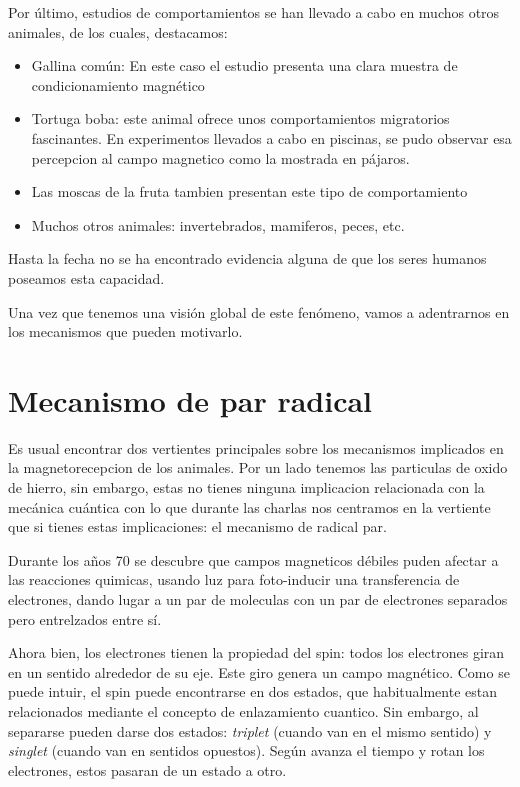 \documentclass[1p]{elsarticle}
\begin{document}
Por último, estudios de comportamientos se han llevado a cabo en muchos otros animales, de los cuales, destacamos: 
\begin{itemize}
	\item Gallina común: En este caso el estudio presenta una clara muestra de condicionamiento magnético
	\item Tortuga boba: este animal ofrece unos comportamientos migratorios fascinantes. En experimentos llevados a cabo en piscinas, se pudo observar esa percepcion al campo magnetico como la mostrada en pájaros.
	\item Las moscas de la fruta tambien presentan este tipo de comportamiento
	\item Muchos otros animales: invertebrados, mamiferos, peces, etc.
\end{itemize}

Hasta la fecha no se ha encontrado evidencia alguna de que los seres humanos poseamos esta capacidad.

Una vez que tenemos una visión global de este fenómeno, vamos a adentrarnos en los mecanismos que pueden motivarlo.


\section{Mecanismo de par radical}
Es usual encontrar dos vertientes principales sobre los mecanismos implicados en la magnetorecepcion de los animales.
Por un lado tenemos las particulas de oxido de hierro, sin embargo, estas no tienes ninguna implicacion relacionada con la mecánica cuántica con lo que durante las charlas nos centramos en la vertiente que si tienes estas implicaciones: el mecanismo de radical par.

Durante los años 70 se descubre que campos magneticos débiles puden afectar a las reacciones quimicas, usando luz para  foto-inducir una transferencia de electrones, dando lugar a un par de moleculas con un par de electrones separados pero entrelzados entre sí.

Ahora bien, los electrones tienen la propiedad del spin: todos los electrones giran en un sentido alrededor de su eje. Este giro genera un campo magnético. Como se puede intuir, el spin puede encontrarse en dos estados, que habitualmente estan relacionados mediante el concepto de enlazamiento cuantico. Sin embargo, al separarse pueden darse dos estados: \textit{triplet} (cuando van en el mismo sentido) y \textit{singlet} (cuando van en sentidos opuestos). Según avanza el tiempo y rotan los electrones, estos pasaran de un estado a otro.
\end{document}
